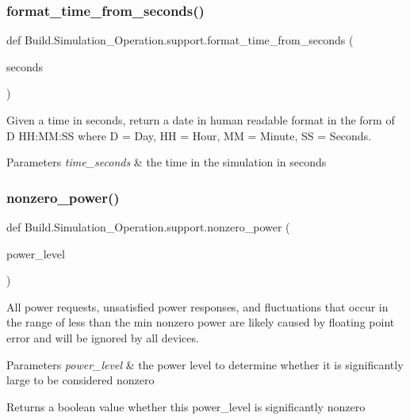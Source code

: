 \subsubsection{\texorpdfstring{format\+\_\+time\+\_\+from\+\_\+seconds()}{format\_time\_from\_seconds()}}
{\footnotesize\ttfamily def Build.\+Simulation\+\_\+\+Operation.\+support.\+format\+\_\+time\+\_\+from\+\_\+seconds (\begin{DoxyParamCaption}\item[{}]{seconds }\end{DoxyParamCaption})}



Given a time in seconds, return a date in human readable format in the form of D H\+H\+:\+MM\+:SS where D = Day, HH = Hour, MM = Minute, SS = Seconds. 


\begin{DoxyParams}{Parameters}
{\em time\+\_\+seconds} & the time in the simulation in seconds \\
\hline
\end{DoxyParams}
\mbox{\label{namespace_build_1_1_simulation___operation_1_1support_acca6fabc27b4396b056093d586ca08b3}} 
\subsubsection{\texorpdfstring{nonzero\+\_\+power()}{nonzero\_power()}}
{\footnotesize\ttfamily def Build.\+Simulation\+\_\+\+Operation.\+support.\+nonzero\+\_\+power (\begin{DoxyParamCaption}\item[{}]{power\+\_\+level }\end{DoxyParamCaption})}



All power requests, unsatisfied power responses, and fluctuations that occur in the range of less than the min nonzero power are likely caused by floating point error and will be ignored by all devices. 


\begin{DoxyParams}{Parameters}
{\em power\+\_\+level} & the power level to determine whether it is significantly large to be considered nonzero \\
\hline
\end{DoxyParams}
\begin{DoxyReturn}{Returns}
a boolean value whether this power\+\_\+level is significantly nonzero 
\end{DoxyReturn}
